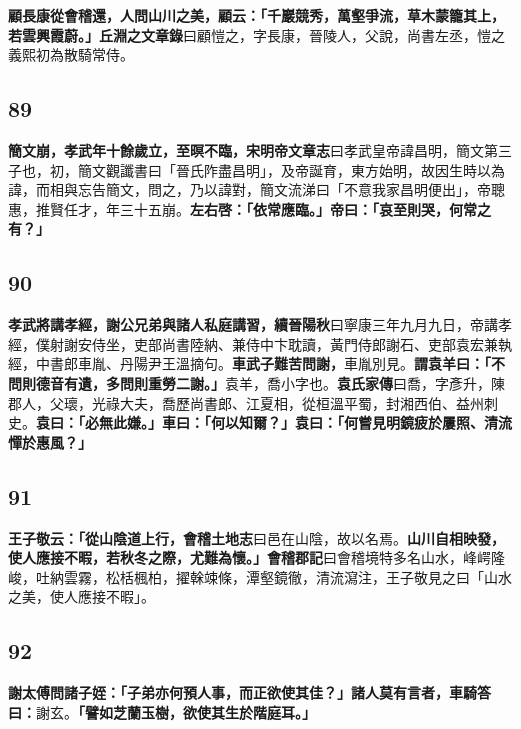 \textbf{顧長康從會稽還，人問山川之美，顧云：「千巖競秀，萬壑爭流，草木蒙籠其上，若雲興霞蔚。」}{\footnotesize \textbf{丘淵之文章錄}曰顧愷之，字長康，晉陵人，父說，尚書左丞，愷之義熙初為散騎常侍。}

\subsection*{89}

\textbf{簡文崩，孝武年十餘歲立，至暝不臨，}{\footnotesize \textbf{宋明帝文章志}曰孝武皇帝諱昌明，簡文第三子也，初，簡文觀讖書曰「晉氏阼盡昌明」，及帝誕育，東方始明，故因生時以為諱，而相與忘告簡文，問之，乃以諱對，簡文流涕曰「不意我家昌明便出」，帝聰惠，推賢任才，年三十五崩。}\textbf{左右啓：「依常應臨。」帝曰：「哀至則哭，何常之有？」}

\subsection*{90}

\textbf{孝武將講孝經，謝公兄弟與諸人私庭講習，}{\footnotesize \textbf{續晉陽秋}曰寧康三年九月九日，帝講孝經，僕射謝安侍坐，吏部尚書陸納、兼侍中卞耽讀，黃門侍郎謝石、吏部袁宏兼執經，中書郎車胤、丹陽尹王溫摘句。}\textbf{車武子難苦問謝，}{\footnotesize 車胤別見。}\textbf{謂袁羊曰：「不問則德音有遺，多問則重勞二謝。」}{\footnotesize 袁羊，喬小字也。\textbf{袁氏家傳}曰喬，字彥升，陳郡人，父瓌，光祿大夫，喬歷尚書郎、江夏相，從桓溫平蜀，封湘西伯、益州刺史。}\textbf{袁曰：「必無此嫌。」車曰：「何以知爾？」袁曰：「何嘗見明鏡疲於屢照、清流憚於惠風？」}

\subsection*{91}

\textbf{王子敬云：「從山陰道上行，}{\footnotesize \textbf{會稽土地志}曰邑在山陰，故以名焉。}\textbf{山川自相映發，使人應接不暇，若秋冬之際，尤難為懷。」}{\footnotesize \textbf{會稽郡記}曰會稽境特多名山水，峰崿隆峻，吐納雲霧，松栝楓柏，擢榦竦條，潭壑鏡徹，清流瀉注，王子敬見之曰「山水之美，使人應接不暇」。}

\subsection*{92}

\textbf{謝太傅問諸子姪：「子弟亦何預人事，而正欲使其佳？」諸人莫有言者，車騎答曰：}{\footnotesize 謝玄。}\textbf{「譬如芝蘭玉樹，欲使其生於階庭耳。」}

